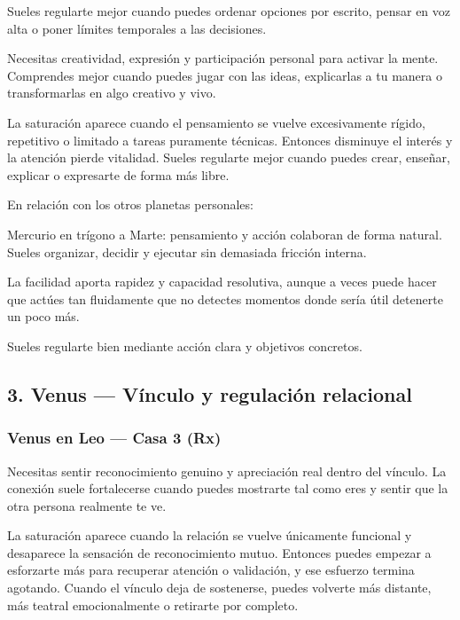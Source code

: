 \documentclass[11pt,a4paper]{article}
\begin{document}
Sueles regularte mejor cuando puedes ordenar opciones por escrito, pensar en voz alta o poner límites temporales a las decisiones.

Necesitas creatividad, expresión y participación personal para activar la mente. Comprendes mejor cuando puedes jugar con las ideas, explicarlas a tu manera o transformarlas en algo creativo y vivo.

La saturación aparece cuando el pensamiento se vuelve excesivamente rígido, repetitivo o limitado a tareas puramente técnicas. Entonces disminuye el interés y la atención pierde vitalidad. Sueles regularte mejor cuando puedes crear, enseñar, explicar o expresarte de forma más libre.

En relación con los otros planetas personales:

Mercurio en trígono a Marte: pensamiento y acción colaboran de forma natural. Sueles organizar, decidir y ejecutar sin demasiada fricción interna.

La facilidad aporta rapidez y capacidad resolutiva, aunque a veces puede hacer que actúes tan fluidamente que no detectes momentos donde sería útil detenerte un poco más.

Sueles regularte bien mediante acción clara y objetivos concretos.

\vspace{0.8cm}

\subsection{3. Venus — Vínculo y regulación relacional}

\subsubsection*{Venus en Leo — Casa 3 (Rx)}

\justifying
Necesitas sentir reconocimiento genuino y apreciación real dentro del vínculo. La conexión suele fortalecerse cuando puedes mostrarte tal como eres y sentir que la otra persona realmente te ve.

La saturación aparece cuando la relación se vuelve únicamente funcional y desaparece la sensación de reconocimiento mutuo. Entonces puedes empezar a esforzarte más para recuperar atención o validación, y ese esfuerzo termina agotando. Cuando el vínculo deja de sostenerse, puedes volverte más distante, más teatral emocionalmente o retirarte por completo.
\end{document}
